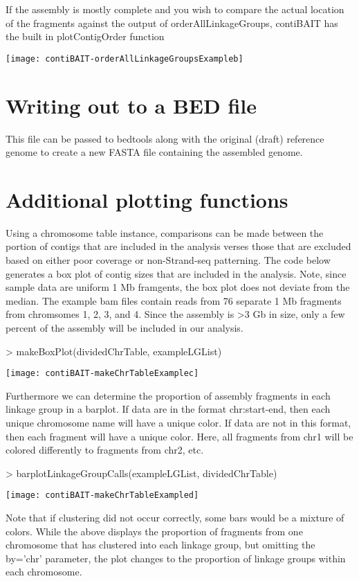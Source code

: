 \documentclass{article}
\begin{document}
If the assembly is mostly complete and you wish to compare the actual location of the fragments against the output of orderAllLinkageGroups, contiBAIT has the built in plotContigOrder function 

\begin{Schunk}
\end{Schunk}
\texttt{[image: contiBAIT-orderAllLinkageGroupsExampleb]}




\section{Writing out to a BED file}
This file can be passed to bedtools along with the original (draft) reference genome to create a new FASTA file containing the assembled genome.

\section{Additional plotting functions}

Using a chromosome table instance, comparisons can be made between the portion of contigs that are included in the analysis verses those that are excluded based on either poor coverage or non-Strand-seq patterning. The code below generates a box plot of contig sizes that are included in the analysis. Note, since sample data are uniform 1 Mb framgents, the box plot does not deviate from the median.  The example bam files contain reads from 76 separate 1 Mb fragments from chromsomes 1, 2, 3, and 4.  Since the assembly is >3 Gb in size, only a few percent of the assembly will be included in our analysis.

\begin{Schunk}
\begin{Sinput}
> makeBoxPlot(dividedChrTable, exampleLGList)
\end{Sinput}
\end{Schunk}
\texttt{[image: contiBAIT-makeChrTableExamplec]}

Furthermore we can determine the proportion of assembly fragments in each linkage group in a barplot. If data are in the format chr:start-end, then each unique chromosome name will have a unique color. If data are not in this format, then each fragment will have a unique color.  Here, all fragments from chr1 will be colored differently to fragments from chr2, etc.

\begin{Schunk}
\begin{Sinput}
> barplotLinkageGroupCalls(exampleLGList, dividedChrTable)
\end{Sinput}
\end{Schunk}
\texttt{[image: contiBAIT-makeChrTableExampled]}

Note that if clustering did not occur correctly, some bars would be a mixture of colors.  While the above displays the proportion of fragments from one chromosome that has clustered into each linkage group, but omitting the by='chr' parameter, the plot changes to the proportion of linkage groups within each chromosome.
\end{document}
